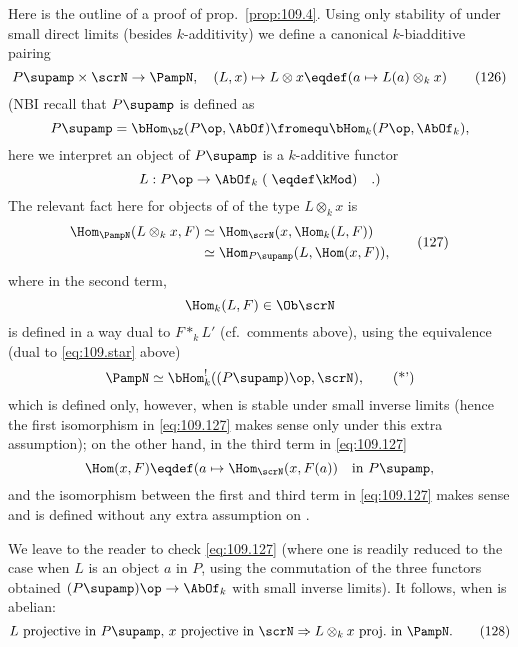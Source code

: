 Here is the outline of a proof of prop.\ \ref{prop:109.4}. Using only
stability of \scrN{} under small direct limits (besides
$k$-additivity) we define a canonical $k$-biadditive pairing
\begin{equation}
  \label{eq:109.126}
  P\supamp \times\scrN \to \PampN ,
  \quad
  (L,x)\mapsto L\otimes x\eqdef
  (a\mapsto L(a)\otimes_k x)\tag{126}
\end{equation}
(NB\enspace I recall that $P\supamp$ is defined as
\[P\supamp = \bHom_{\bZ}(P\op,\AbOf)\fromequ\bHom_k(P\op,\AbOf_k),\]
here we interpret an object of $P\supamp$ is a $k$-additive functor
\[L:P\op\to\AbOf_k\;(\;\eqdef\kMod)\quad\text{.)}\]
The relevant fact here for objects of \PampN{} of the type $L\otimes_k
x$ is
\begin{equation}
  \label{eq:109.127}
  \begin{aligned}
    \Hom_\PampN(L\otimes_kx,F) &\simeq \Hom_\scrN(x,\Hom_k(L,F)) \\
    &\simeq \Hom_{P\supamp}(L, \Hom(x,F)),
  \end{aligned}\tag{127}
\end{equation}
where in the second term,
\[\Hom_k(L,F)\in\Ob\scrN\]
is defined in a way dual to $F*_k L'$ (cf.\ comments above), using the
equivalence (dual to \eqref{eq:109.star} above)
\begin{equation}
  \label{eq:109.starprime}
  \PampN\simeq\bHom_k^!((P\supamp)\op,\scrN),\tag{*'}
\end{equation}
which is defined only, however, when \scrN{} is stable under small
inverse limits (hence the first isomorphism in \eqref{eq:109.127}
makes sense only under this extra assumption); on the other hand, in
the third term in \eqref{eq:109.127}
\[\Hom(x,F) \eqdef (a\mapsto\Hom_\scrN(x,F(a))\quad\text{in
  $P\supamp$,}\]
and the isomorphism between the first and third term in
\eqref{eq:109.127} makes sense and is defined without any extra
assumption on \scrN.

We leave to the reader to check \eqref{eq:109.127} (where one is
readily reduced to the case when $L$ is an object $a$ in $P$, using
the commutation of the three functors obtained
$(P\supamp)\op\to\AbOf_k$ with small inverse limits). It follows, when
\scrN{} is abelian:
\begin{equation}
  \label{eq:109.128}
  \text{$L$ projective in $P\supamp$, $x$ projective in \scrN}
  \Rightarrow
  \text{$L\otimes_kx$ proj.\ in \PampN.}\tag{128}
\end{equation}

